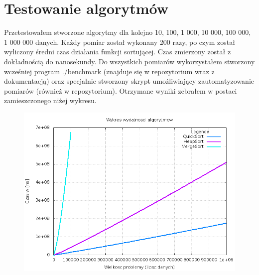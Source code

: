 \documentclass[a4paper,12pt]{article}
\begin{document}
\section{Testowanie algorytmów}

Przetestowałem stworzone algorytmy dla kolejno 10, 100, 1 000, 10 000, 100 000, 1 000 000 danych. Każdy pomiar został wykonany 200 razy, po czym został wyliczony 
średni czas działania funkcji sortującej. Czas zmierzony został z dokładnością do nanosekundy. Do wszystkich pomiarów wykorzystałem stworzony wcześniej program
./benchmark (znajduje się w repozytorium wraz z dokumentacją) oraz specjalnie stworzony skrypt umożliwiający zautomatyzowanie pomiarów (również w repozytorium). Otrzymane wyniki zebrałem
w postaci zamieszczonego niżej wykresu.

\begin{center}
	\begin{figure}[h]
		\includegraphics[scale = 0.4]{Eksperyment.png}
	\end{figure}
\end{center}
\end{document}
